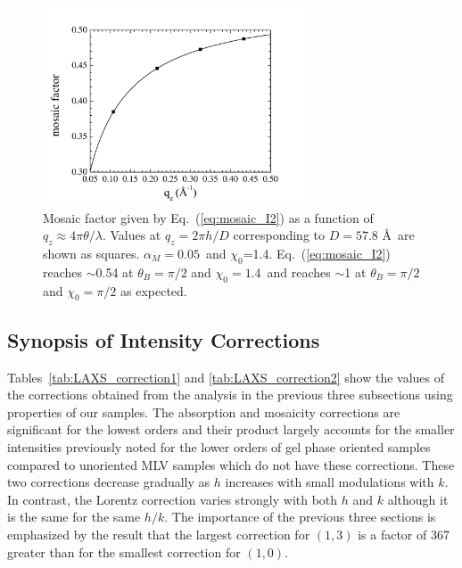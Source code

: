 \begin{figure}[htb]
  \centering
  \includegraphics[width=0.7\textwidth]{figures/ripple/analysis/mosaic_correction}
  \caption[Mosaic factor given by 
  Eq.~(\ref{eq:mosaic_I2}) as a function of 
  $q_z\approx 4\pi\theta/\lambda$]
  {Mosaic factor given by 
  Eq.~(\ref{eq:mosaic_I2}) as a function of 
  $q_z\approx 4\pi\theta/\lambda$. Values at $q_z=2\pi h/D$ corresponding 
  to $D=57.8$ \AA\ are shown as squares. $\alpha_M=0.05$\textdegree\ and 
  $\chi_0$=1.4\textdegree. Eq.~(\ref{eq:mosaic_I2}) reaches $\sim$0.54 at 
  $\theta_B=\pi/2$ and $\chi_0=1.4$\textdegree\ and reaches $\sim$1 at
  $\theta_B=\pi/2$ and $\chi_0=\pi/2$ as expected.}
  \label{fig:mosaic_correction}
\end{figure}

\subsection{Synopsis of Intensity Corrections}
Tables~\ref{tab:LAXS_correction1} and \ref{tab:LAXS_correction2} show
the values of the corrections obtained from the analysis in the previous three 
subsections using properties of our samples. The absorption and mosaicity 
corrections are significant for the lowest orders and their product largely 
accounts for the smaller intensities previously noted 
\cite{ref:Guler09} for the lower orders of gel phase oriented 
samples compared to unoriented MLV samples which do not have these corrections.  
These two corrections decrease gradually as $h$ increases with small 
modulations with $k$. In contrast, the Lorentz correction varies strongly with 
both $h$ and $k$ although it is the same for the same $h/k$. The importance of 
the previous three sections is emphasized by the result that the largest 
correction for $(1,3)$ is a factor of 367 greater than for the smallest 
correction for $(1,0)$.

